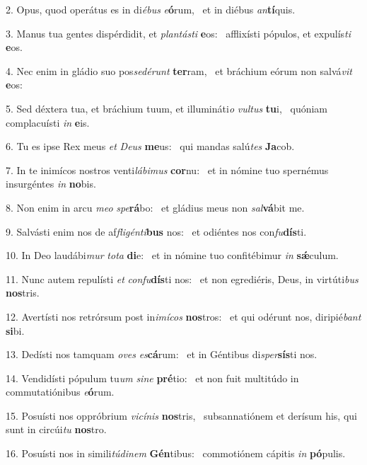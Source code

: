 2. Opus, quod operátus es in di\textit{é}\textit{bus} \textit{e}\textbf{ó}rum, \ast\  et in diébus \textit{an}\textbf{tí}quis.\

3. Manus tua gentes dispérdidit, et \textit{plan}\textit{tás}\textit{ti} \textbf{e}os: \ast\  afflixísti pópulos, et expulís\textit{ti} \textbf{e}os.\

4. Nec enim in gládio suo pos\textit{se}\textit{dé}\textit{runt} \textbf{ter}ram, \ast\  et bráchium eórum non salvá\textit{vit} \textbf{e}os:\

5. Sed déxtera tua, et bráchium tuum, et illumináti\textit{o} \textit{vul}\textit{tus} \textbf{tu}i, \ast\  quóniam complacuísti \textit{in} \textbf{e}is.\

6. Tu es ipse Rex meus \textit{et} \textit{De}\textit{us} \textbf{me}us: \ast\  qui mandas salú\textit{tes} \textbf{Ja}cob.\

7. In te inimícos nostros venti\textit{lá}\textit{bi}\textit{mus} \textbf{cor}nu: \ast\  et in nómine tuo spernémus insurgéntes \textit{in} \textbf{no}bis.\

8. Non enim in arcu \textit{me}\textit{o} \textit{spe}\textbf{rá}bo: \ast\  et gládius meus non \textit{sal}\textbf{vá}bit me.\

9. Salvásti enim nos de af\textit{fli}\textit{gén}\textit{ti}\textbf{bus} nos: \ast\  et odiéntes nos con\textit{fu}\textbf{dís}ti.\

10. In Deo laudábi\textit{mur} \textit{to}\textit{ta} \textbf{di}e: \ast\  et in nómine tuo confitébimur \textit{in} \textbf{sǽ}culum.\

11. Nunc autem repulísti \textit{et} \textit{con}\textit{fu}\textbf{dís}ti nos: \ast\  et non egrediéris, Deus, in virtúti\textit{bus} \textbf{nos}tris.\

12. Avertísti nos retrórsum post in\textit{i}\textit{mí}\textit{cos} \textbf{nos}tros: \ast\  et qui odérunt nos, diripié\textit{bant} \textbf{si}bi.\

13. Dedísti nos tamquam \textit{o}\textit{ves} \textit{es}\textbf{cá}rum: \ast\  et in Géntibus di\textit{sper}\textbf{sís}ti nos.\

14. Vendidísti pópulum tu\textit{um} \textit{si}\textit{ne} \textbf{pré}tio: \ast\  et non fuit multitúdo in commutatiónibus \textit{e}\textbf{ó}rum.\

15. Posuísti nos oppróbrium \textit{vi}\textit{cí}\textit{nis} \textbf{nos}tris, \ast\  subsannatiónem et derísum his, qui sunt in circúi\textit{tu} \textbf{nos}tro.\

16. Posuísti nos in simili\textit{tú}\textit{di}\textit{nem} \textbf{Gén}tibus: \ast\  commotiónem cápitis \textit{in} \textbf{pó}pulis.\

